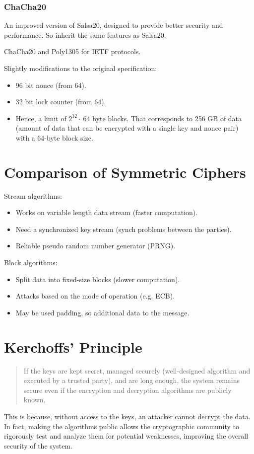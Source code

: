 \subsubsection{ChaCha20}
An improved version of Salsa20, designed to provide better security and performance. So inherit the same features as Salsa20.
\begin{center}
    ChaCha20 and Poly1305 for IETF protocols.
\end{center}
Slightly modifications to the original specification:
\begin{itemize}
    \item 96 bit nonce (from 64).
    \item 32 bit lock counter (from 64).
    \item Hence, a limit of $2^{32} \cdot \ 64$ byte blocks. That corresponds to 256 GB of data (amount of data that can be encrypted with a single key and nonce pair) with a 64-byte block size.
\end{itemize}

\section{Comparison of Symmetric Ciphers}



\begin{multicols}{2}

    Stream algorithms:
    \begin{itemize}
        \item Works on variable length data stream (faster computation).
        \item Need a synchronized key stream (synch problems between the parties).
        \item Reliable pseudo random number generator (PRNG).
    \end{itemize} 
\columnbreak

Block algorithms:
\begin{itemize}
    \item Split data into fixed-size blocks (slower computation).
    \item Attacks based on the mode of operation (e.g. ECB).
    \item May be used padding, so additional data to the message.
\end{itemize}
\end{multicols}

\section{Kerchoffs' Principle}
\begin{quotation}
    If the keys are kept secret, managed securely (well-designed algorithm and executed by a trusted party), and are long enough, the system remains secure even if the encryption and decryption algorithms are publicly known. 
\end{quotation}
    This is because, without access to the keys, an attacker cannot decrypt the data. In fact, making the algorithms public allows the cryptographic community to rigorously test and analyze them for potential weaknesses, improving the overall security of the system.


